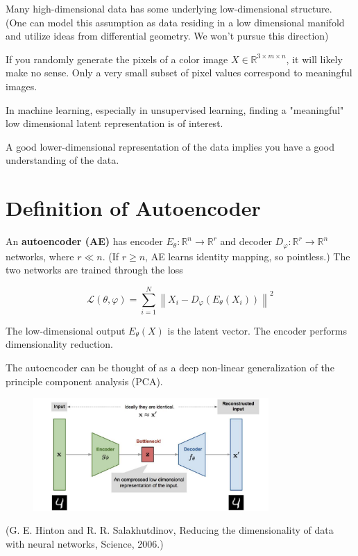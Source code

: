 \documentclass{report}
\begin{document}
\begin{concept}
    Many high-dimensional data has some underlying low-dimensional structure.
    (One can model this assumption as data residing in a low dimensional manifold and utilize ideas from differential geometry. We won’t pursue this direction)

    If you randomly generate the pixels of a color image $X \in \mathbb{R}^{3 \times m \times n}$, it will likely make no sense. Only a very small subset of pixel values correspond to meaningful images.

    In machine learning, especially in unsupervised learning, finding a "meaningful" low dimensional latent representation is of interest.

    A good lower-dimensional representation of the data implies you have a good understanding of the data.
\end{concept}

\section{Definition of Autoencoder}

\begin{definition}[9.3][Autoencoder]
    An \textbf{autoencoder (AE)} has encoder $E_{\theta}: \mathbb{R}^{n} \rightarrow \mathbb{R}^{r}$ and decoder $D_{\varphi}: \mathbb{R}^{r} \rightarrow \mathbb{R}^{n}$ networks, where $r \ll n$. (If $r \geq n$, AE learns identity mapping, so pointless.) The two networks are trained through the loss

    $$
    \mathcal{L}(\theta, \varphi)=\sum_{i=1}^{N}\left\|X_{i}-D_{\varphi}\left(E_{\theta}\left(X_{i}\right)\right)\right\|^{2}
    $$

    The low-dimensional output $E_{\theta}(X)$ is the latent vector. The encoder performs dimensionality reduction.

    The autoencoder can be thought of as a deep non-linear generalization of the principle component analysis (PCA).

    \begin{figure}[H]
        \centering
        \includegraphics[width=0.8\textwidth]{.././assets/9.1.png}
    \end{figure}

    (G. E. Hinton and R. R. Salakhutdinov, Reducing the dimensionality of data with neural networks, Science, 2006.)
\end{definition}
\end{document}
